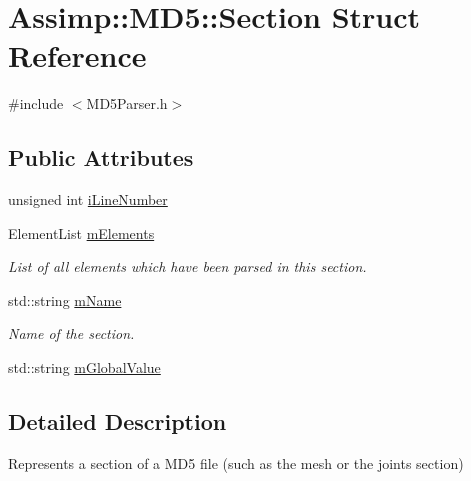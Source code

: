 \hypertarget{struct_assimp_1_1_m_d5_1_1_section}{\section{Assimp\+:\+:M\+D5\+:\+:Section Struct Reference}
\label{struct_assimp_1_1_m_d5_1_1_section}
}


{\ttfamily \#include $<$M\+D5\+Parser.\+h$>$}

\subsection*{Public Attributes}
\begin{DoxyCompactItemize}
\item 
unsigned int \hyperlink{struct_assimp_1_1_m_d5_1_1_section_ad5d93fa3f16dc026086217c0352304cf}{i\+Line\+Number}
\item 
\hypertarget{struct_assimp_1_1_m_d5_1_1_section_a5d1e2c81a0659e71a7f0022e380e87e9}{Element\+List \hyperlink{struct_assimp_1_1_m_d5_1_1_section_a5d1e2c81a0659e71a7f0022e380e87e9}{m\+Elements}}\label{struct_assimp_1_1_m_d5_1_1_section_a5d1e2c81a0659e71a7f0022e380e87e9}

\begin{DoxyCompactList}\small\item\em List of all elements which have been parsed in this section. \end{DoxyCompactList}\item 
\hypertarget{struct_assimp_1_1_m_d5_1_1_section_a34876df8416c83e8d1a2d958384f3600}{std\+::string \hyperlink{struct_assimp_1_1_m_d5_1_1_section_a34876df8416c83e8d1a2d958384f3600}{m\+Name}}\label{struct_assimp_1_1_m_d5_1_1_section_a34876df8416c83e8d1a2d958384f3600}

\begin{DoxyCompactList}\small\item\em Name of the section. \end{DoxyCompactList}\item 
std\+::string \hyperlink{struct_assimp_1_1_m_d5_1_1_section_ae8c58e6f7a377cd0c8f079d6262c71ef}{m\+Global\+Value}
\end{DoxyCompactItemize}


\subsection{Detailed Description}
Represents a section of a M\+D5 file (such as the mesh or the joints section)

